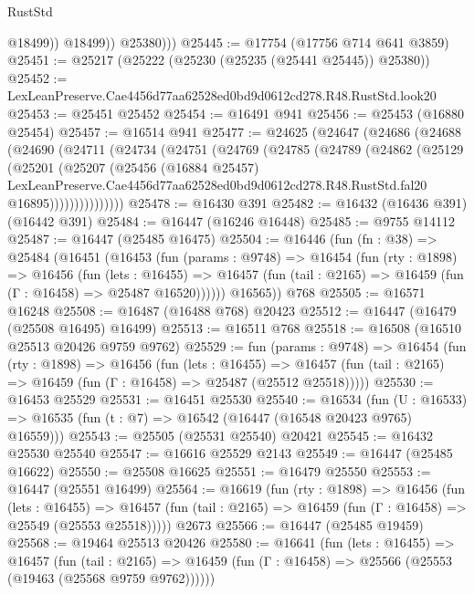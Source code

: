 \begin{lexlean}{RustStd}
\begin{coremodule}
                  @18499))
              @18499))
          @25380)))
@25445 := @17754 (@17756 @714 @641 @3859)
@25451 := @25217 (@25222 (@25230 (@25235 (@25441 @25445)) @25380))
@25452 := LexLeanPreserve.Cae4456d77aa62528ed0bd9d0612cd278.R48.RustStd.look20
@25453 := @25451 @25452
@25454 := @16491 @941
@25456 := @25453 (@16880 @25454)
@25457 := @16514 @941
@25477 := @24625
    (@24647
      (@24686
        (@24688
          (@24690
            (@24711
              (@24734
                (@24751
                  (@24769
                    (@24785
                      (@24789
                        (@24862
                          (@25129
                            (@25201
                              (@25207
                                (@25456
                                  (@16884 @25457)
                                  LexLeanPreserve.Cae4456d77aa62528ed0bd9d0612cd278.R48.RustStd.fal20
                                  @16895)))))))))))))))
@25478 := @16430 @391
@25482 := @16432 (@16436 @391) (@16442 @391)
@25484 := @16447 (@16246 @16448)
@25485 := @9755 @14112
@25487 := @16447 (@25485 @16475)
@25504 := @16446
    (fun (fn : @38) =>
    @25484
      (@16451
        (@16453
          (fun (params : @9748) =>
          @16454
            (fun (rty : @1898) =>
            @16456
              (fun (lets : @16455) =>
              @16457 (fun (tail : @2165) => @16459 (fun (Γ : @16458) => @25487 @16520))))))
        @16565))
    @768
@25505 := @16571 @16248
@25508 := @16487 (@16488 @768) @20423
@25512 := @16447 (@16479 (@25508 @16495) @16499)
@25513 := @16511 @768
@25518 := @16508 (@16510 @25513 @20426 @9759 @9762)
@25529 := fun (params : @9748) =>
  @16454
    (fun (rty : @1898) =>
    @16456
      (fun (lets : @16455) =>
      @16457 (fun (tail : @2165) => @16459 (fun (Γ : @16458) => @25487 (@25512 @25518)))))
@25530 := @16453 @25529
@25531 := @16451 @25530
@25540 := @16534
    (fun (U : @16533) => @16535 (fun (t : @7) => @16542 (@16447 (@16548 @20423 @9765) @16559)))
@25543 := @25505 (@25531 @25540) @20421
@25545 := @16432 @25530 @25540
@25547 := @16616 @25529 @2143
@25549 := @16447 (@25485 @16622)
@25550 := @25508 @16625
@25551 := @16479 @25550
@25553 := @16447 (@25551 @16499)
@25564 := @16619
    (fun (rty : @1898) =>
    @16456
      (fun (lets : @16455) =>
      @16457 (fun (tail : @2165) => @16459 (fun (Γ : @16458) => @25549 (@25553 @25518)))))
    @2673
@25566 := @16447 (@25485 @19459)
@25568 := @19464 @25513 @20426
@25580 := @16641
    (fun (lets : @16455) =>
    @16457
      (fun (tail : @2165) =>
      @16459 (fun (Γ : @16458) => @25566 (@25553 (@19463 (@25568 @9759 @9762))))))

\end{coremodule}
\end{lexlean}
